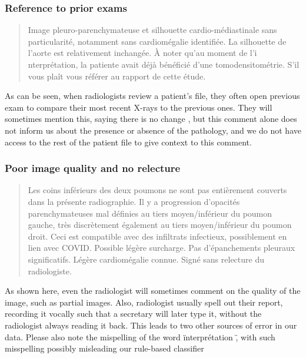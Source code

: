 \documentclass[11pt]{article}
\begin{document}
     \subsubsection{Reference to prior exams}
            \begin{quote}
                Image pleuro-parenchymateuse et silhouette cardio-médiastinale sans particularité, notamment sans cardiomégalie identifiée. La silhouette de l'aorte est relativement inchangée.
                À noter qu'au moment de l'i nterprétation, la patiente avait déjà bénéficié d'une tomodensitométrie. S'il vous plaît vous référer au rapport de cette étude.
           \end{quote}

        As can be seen, when radiologists review a patient's file, they often open previous exam to compare their most recent X-rays to the previous ones. They will sometimes mention this, saying there is no change , but this comment
        alone does not inform us about the presence or absence of the pathology, and we do not have access to the rest of the patient file to give context to this comment.

    \subsubsection{Poor image quality and no relecture}
       \begin{quote}
            Les coins inférieurs des deux poumons ne sont pas entièrement couverts dans la présente radiographie.
            Il y a progression d'opacités parenchymateuses mal définies au tiers moyen/inférieur du poumon gauche, très discrètement également au tiers moyen/inférieur du poumon droit. Ceci est compatible avec des infiltrats infectieux, possiblement en lien avec COVID. Possible légère surcharge. Pas d'épanchements pleuraux significatifs. Légère cardiomégalie connue.
            Signé sans relecture du radiologiste.
        \end{quote}

    As shown here, even the radiologist will sometimes comment on the quality of the image, such as partial images. Also, radiologist usually spell out their report, recording it vocally such that a secretary will later type it, without the radiologist
    always reading it back. This leads to two other sources of error in our data. Please also note the mispelling of the word \" interprétation \" , with such misspelling  possibly misleading our rule-based classifier
\end{document}
